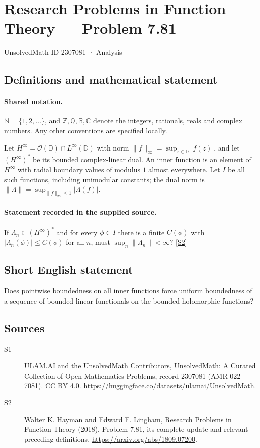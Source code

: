 \documentclass[11pt]{article}
\newcommand{\sref}[2]{\hyperlink{source:#1:#2}{[S#2]}}
\begin{document}
\setcounter{section}{2307080}
\section{Research Problems in Function Theory — Problem 7.81}\label{2307081}
{\small\sffamily UnsolvedMath ID 2307081 · Analysis}
\subsection{Definitions and mathematical statement}

\paragraph{Shared notation.}$\mathbb N=\{1,2,\ldots\}$, and $\mathbb Z,\mathbb Q,\mathbb R,\mathbb C$ denote the integers, rationals, reals and complex numbers. Any other conventions are specified locally.


Let $H^\infty=\mathcal O(\mathbb D)\cap L^\infty(\mathbb D)$ with norm $\|f\|_\infty=\sup_{z\in\mathbb D}|f(z)|$, and let $(H^\infty)^*$ be its bounded complex-linear dual. An inner function is an element of $H^\infty$ with radial boundary values of modulus $1$ almost everywhere. Let $I$ be all such functions, including unimodular constants; the dual norm is $\|\Lambda\|=\sup_{\|f\|_\infty\le1}|\Lambda(f)|$.
\paragraph{Statement recorded in the supplied source.}
If $\Lambda_n\in(H^\infty)^*$ and for every $\phi\in I$ there is a finite $C(\phi)$ with $|\Lambda_n(\phi)|\le C(\phi)$ for all $n$, must $\sup_n\|\Lambda_n\|<\infty$? \sref{2307081}{2}
\subsection{Short English statement}
Does pointwise boundedness on all inner functions force uniform boundedness of a sequence of bounded linear functionals on the bounded holomorphic functions?
\subsection{Sources}
\begin{description}
\item[\hypertarget{source:2307081:1}{S1}] ULAM.AI and the UnsolvedMath Contributors, UnsolvedMath: A Curated Collection of Open Mathematics Problems, record 2307081 (AMR-022-7081). CC BY 4.0. \url{https://huggingface.co/datasets/ulamai/UnsolvedMath}.
\item[\hypertarget{source:2307081:2}{S2}] Walter K. Hayman and Edward F. Lingham, Research Problems in Function Theory (2018), Problem 7.81, its complete update and relevant preceding definitions. \url{https://arxiv.org/abs/1809.07200}.
\end{description}
\label{end:2307081}
\end{document}
